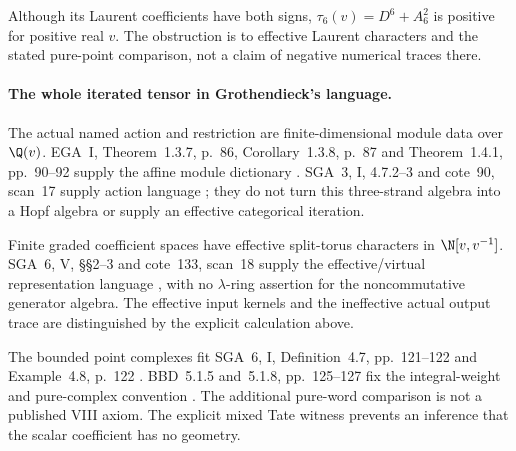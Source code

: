 Although its Laurent coefficients have both
signs, \(\tau_6(v)=D^6+A_6^2\) is positive
for positive real \(v\). The obstruction is
to effective Laurent characters and the
stated pure-point comparison, not a claim
of negative numerical traces there.

\paragraph{The  whole iterated tensor in Grothendieck's language.}
The actual named action and restriction are
finite-dimensional module data over \(\Q(v)\).
EGA~I, Theorem~1.3.7, p.~86,
Corollary~1.3.8, p.~87 and
Theorem~1.4.1, pp.~90--92 supply the affine
module dictionary \cite{EGA}.
SGA~3, I, 4.7.2--3 and cote~90, scan~17
supply action language \cite{SGA3,Archive};
they do not turn this three-strand algebra
into a Hopf algebra or supply an effective
categorical iteration.

Finite graded coefficient spaces have effective
split-torus characters in \(\N[v,v^{-1}]\).
SGA~6, V, \S\S2--3 and cote~133, scan~18
supply the effective/virtual representation
language \cite{SGA6,Archive}, with no
\(\lambda\)-ring assertion for the
noncommutative generator algebra.
The effective input kernels and the ineffective
actual output trace are distinguished by the
explicit calculation above.

The bounded point complexes fit SGA~6, I,
Definition~4.7, pp.~121--122 and
Example~4.8, p.~122 \cite{SGA6}.
BBD~5.1.5 and~5.1.8, pp.~125--127 fix the
integral-weight and pure-complex convention
\cite{BBD}.
The additional pure-word comparison is not
a published VIII axiom. The explicit mixed
Tate witness prevents an inference that
the scalar coefficient has no geometry.
